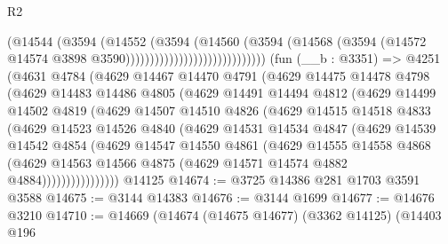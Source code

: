 \begin{lexlean}{R2}
\begin{coremodule}
                                            (@14544
                                              (@3594
                                                (@14552
                                                  (@3594
                                                    (@14560
                                                      (@3594
                                                        (@14568
                                                          (@3594
                                                            (@14572
                                                              @14574
                                                              @3898
                                                              @3590)))))))))))))))))))))))))))))
    (fun (__b : @3351) =>
    @4251
      (@4631
        @4784
        (@4629
          @14467
          @14470
          @4791
          (@4629
            @14475
            @14478
            @4798
            (@4629
              @14483
              @14486
              @4805
              (@4629
                @14491
                @14494
                @4812
                (@4629
                  @14499
                  @14502
                  @4819
                  (@4629
                    @14507
                    @14510
                    @4826
                    (@4629
                      @14515
                      @14518
                      @4833
                      (@4629
                        @14523
                        @14526
                        @4840
                        (@4629
                          @14531
                          @14534
                          @4847
                          (@4629
                            @14539
                            @14542
                            @4854
                            (@4629
                              @14547
                              @14550
                              @4861
                              (@4629
                                @14555
                                @14558
                                @4868
                                (@4629
                                  @14563
                                  @14566
                                  @4875
                                  (@4629 @14571 @14574 @4882 @4884))))))))))))))))
    @14125
@14674 := @3725 @14386 @281 @1703 @3591 @3588
@14675 := @3144 @14383
@14676 := @3144 @1699
@14677 := @14676 @3210
@14710 := @14669
    (@14674
      (@14675 @14677)
      (@3362 @14125)
      (@14403
        @196

\end{coremodule}
\end{lexlean}
